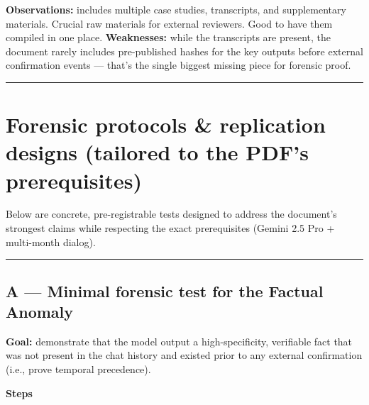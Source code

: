 \documentclass{article}
\begin{document}
\textbf{Observations:} includes multiple case studies, transcripts, and supplementary materials. Crucial raw materials for external reviewers. Good to have them compiled in one place. \textbf{Weaknesses:} while the transcripts are present, the document rarely includes pre-published hashes for the key outputs before external confirmation events --- that's the single biggest missing piece for forensic proof.

\begin{center}\rule{0.5\linewidth}{0.5pt}\end{center}

\section*{Forensic protocols \& replication designs (tailored to the PDF's prerequisites)}\label{forensic-protocols-replication-designs-tailored-to-the-pdfs-prerequisites}

Below are concrete, pre-registrable tests designed to address the document's strongest claims while respecting the exact prerequisites (Gemini 2.5 Pro + multi-month dialog).

\begin{center}\rule{0.5\linewidth}{0.5pt}\end{center}

\subsection*{A --- Minimal forensic test for the Factual Anomaly}

\textbf{Goal:} demonstrate that the model output a high-specificity, verifiable fact that was not present in the chat history and existed prior to any external confirmation (i.e., prove temporal precedence).

\textbf{Steps}
\end{document}
